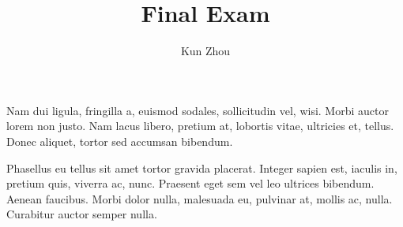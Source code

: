 \documentclass{homework}
\title{Final Exam}
\author{Kun Zhou}
\begin{document}
\maketitle
    \problem  Nam dui ligula, fringilla a, euismod sodales, sollicitudin vel, wisi. Morbi auctor lorem non justo. Nam lacus libero, pretium at, lobortis vitae, ultricies et, tellus. Donec aliquet, tortor sed accumsan bibendum.
     \begin{answer} 
     \lipsum[1]
     \end{answer}
    \problem Phasellus eu tellus sit amet tortor gravida placerat. Integer sapien est, iaculis in, pretium quis, viverra ac, nunc. Praesent eget sem vel leo ultrices bibendum. Aenean faucibus. Morbi dolor nulla, malesuada eu, pulvinar at, mollis ac, nulla. Curabitur auctor semper nulla.
     \begin{answer} 
     \lipsum[3]
     \end{answer}
\end{document}
